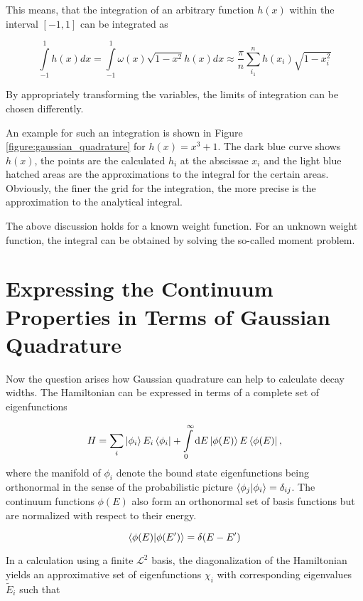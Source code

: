 This means, that the integration of an arbitrary function $h(x)$ within
the interval $[-1,1]$ can be integrated as

\begin{equation}
  \int\limits_{-1}^1 h(x) dx = \int\limits_{-1}^1 \omega(x) \sqrt{1-x^2} h(x) dx
  \approx \frac \pi n \sum\limits_{i_1}^n h(x_i) \sqrt{1-x_i^2}
\end{equation}

By appropriately transforming the variables, the limits of integration can be
chosen differently.

An example for such an integration is shown in Figure \ref{figure:gaussian_quadrature}
for $h(x) = x^3 + 1$. The dark blue curve shows $h(x)$, the points are the
calculated $h_i$ at the abscissae $x_i$ and the light blue hatched areas are the
approximations to the integral for the certain areas. Obviously, the finer the
grid for the integration, the more precise is the approximation to
the analytical integral.

The above discussion holds for a known weight function.
For an unknown weight function, the integral can be obtained by solving the so-called
moment problem. \cite{Reinhardt79}




\section{Expressing the Continuum Properties in Terms of Gaussian Quadrature}
Now the question arises how Gaussian quadrature can help to calculate
decay widths.
The Hamiltonian can be expressed in terms of a complete set of eigenfunctions

\begin{equation} \label{equation:complete_hamniltonian}
  H = \sum\limits_i \ket{\phi_i} E_i \bra{\phi_i}
     + \int\limits_0^\infty \mathrm{d}E \ket{\phi(E)} E \bra{\phi(E)}  ,
\end{equation}
where the manifold of $\phi_i$ denote the bound state eigenfunctions being orthonormal
in the sense of the probabilistic picture $\braket{\phi_j|\phi_i} = \delta_{ij}$.
The continuum functions $\phi(E)$ also form an orthonormal set of basis functions
but are normalized with respect to their energy.

\begin{equation}
  \braket{\phi(E) | \phi(E')} = \delta(E-E')
\end{equation}

In a calculation using a finite $\mathcal{L}^2$ basis, the diagonalization of the
Hamiltonian yields an approximative set of eigenfunctions $\chi_i$ with corresponding
eigenvalues $\tilde{E}_i$ such that

